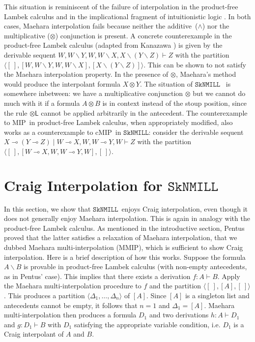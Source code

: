 \documentclass[sn-mathphys-num]{sn-jnl}%
\newcommand{\GD}{\Delta}
\newcommand{\vd}{\vdash}
\newcommand{\tl}{\otimes \mathsf{L}}
\newcommand{\ot}{\otimes}
\newcommand{\lolli}{\multimap}
\newcommand{\bsls}{\backslash}
\newcommand{\SkNMILL}{$\mathtt{SkNMILL}$}
\newcommand{\MIP}{\textsf{MIP}}
\newcommand{\MMIP}{\textsf{MMIP}}
\newcommand{\cMIP}{\textsf{cMIP}}
\theoremstyle{thmstyleone}%
\theoremstyle{thmstyletwo}%
\theoremstyle{thmstylethree}%
\begin{document}
This situation is reminiscent of the failure of interpolation in the product-free Lambek calculus \cite{Pentus1997} and in the implicational fragment of intuitionistic logic \cite{Kanazawa2006}.
In both cases, Maehara
interpolation fails because neither the additive~($\land$) nor the multiplicative ($\ot$) conjunction is present.
A concrete counterexample in the product-free Lambek calculus (adapted from Kanazawa \cite{Kanazawa2006}) is given by the derivable sequent $W, W\bsls Y, W , W \bsls X , X \bsls (Y \bsls Z) \vd Z$ with the partition $\langle [\ ] , [W, W\bsls Y, W , W \bsls X], [X \bsls (Y \bsls Z)] \rangle$. This can be shown to not satisfy the Maehara interpolation property. In the presence of $\ot$,  Maehara's method would produce the interpolant formula $X \ot Y$. The situation of \SkNMILL~ is somewhere inbetween: we have a multiplicative conjunction $\ot$ but we cannot do much with it if a formula $A \ot B$ is in context instead of the stoup position, since the rule $\tl$ cannot be applied arbitrarily in the antecedent.
The counterexample to \MIP~in product-free Lambek calculus, when appropriately modified, also works as a counterexample to \cMIP~in \SkNMILL: consider the derivable sequent  $X \lolli (Y \lolli Z) \mid W \lolli X, W , W \lolli Y, W \vd Z$ with the partition $\langle [\ ] , [W \lolli X, W , W \lolli Y, W], [\ ] \rangle$.

\section{Craig Interpolation for \SkNMILL}\label{sec:interpolation}

In this section, we show that \SkNMILL~enjoys Craig interpolation, even though it does not generally enjoy Maehara interpolation.
This is again in analogy with the product-free Lambek calculus. 
As mentioned in the introductive section, Pentus \cite{Pentus1997} proved that the latter satisfies a relaxation of Maehara interpolation, that we dubbed Maehara multi-interpolation (\MMIP), which is sufficient to show Craig interpolation. 
Here is a brief description of how this works.
Suppose the formula $A \bsls B$ is provable in product-free Lambek calculus (with non-empty antecedents, as in Pentus' case).
This implies that there exists a derivation $f : A \vd B$.
Apply the Maehara multi-interpolation procedure to $f$ and the partition $\langle [\ ],[A],[\ ]\rangle$.
This produces a partition $\langle \GD_1,\dots,\GD_n \rangle$ of $[A]$.
Since $[A]$ is a singleton list and antecedents cannot be empty, it follows that $n = 1$ and $\GD_1 = [ A ]$.
Maehara multi-interpolation then produces a formula $D_1$ and two derivations $h : A \vd D_1$ and $g : D_1 \vd B$ with $D_1$ satisfying the appropriate variable condition, i.e. $D_1$ is a Craig interpolant of $A$ and $B$.
\end{document}
